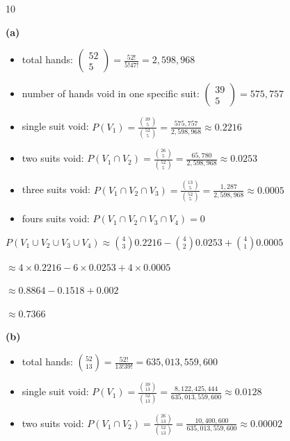 \documentclass[12 pt]{article}
\begin{document}
    \begin{exercise}{10}
    \hfill

    \textbf{(a)}
    \begin{itemize}
        \item total hands: $\begin{pmatrix}
            52 \\
            5
        \end{pmatrix} = \frac{52!}{5!47!} = 2,598,968$
        
        \item number of hands void in one specific suit: $\begin{pmatrix}
            39 \\
            5
        \end{pmatrix} = 575,757$

        \item single suit void: $P(V_1) = \frac{\binom{39}{5}}{\binom{52}{5}} = \frac{575,757}{2,598,968} \approx 0.2216$

        \item two suits void: $P(V_1 \cap V_2) = \frac{\binom{26}{5}}{\binom{52}{5}} = \frac{65,780}{2,598,968} \approx 0.0253$

        \item three suits void: $P(V_1 \cap V_2 \cap V_3) = \frac{\binom{13}{5}}{\binom{52}{5}} = \frac{1,287}{2,598,968} \approx 0.0005$

        \item fours suits void: $P(V_1 \cap V_2 \cap V_3 \cap V_4) = 0$
    \end{itemize}

    $P(V_1 \cup V_2 \cup V_3 \cup V_4) \approx \binom{4}{3} 0.2216 - \binom{4}{2} 0.0253 + \binom{4}{1} 0.0005$

    $\approx 4 \times 0.2216 - 6 \times 0.0253 + 4 \times 0.0005$

    $\approx 0.8864 - 0.1518 + 0.002$

    $\approx 0.7366$

    \textbf{(b)}
    \begin{itemize}
        \item total hands: $\binom{52}{13} = \frac{52!}{13!39!} = 635,013,559,600$

        \item single suit void: $P(V_1) = \frac{\binom{39}{13}}{\binom{52}{13}} = \frac{8,122,425,444}{635,013,559,600} \approx 0.0128$

        \item two suits void: $P(V_1 \cap V_2) = \frac{\binom{26}{13}}{\binom{52}{13}} = \frac{10,400,600}{635,013,559,600} \approx 0.00002$


\end{itemize}
\end{exercise}
\end{document}
